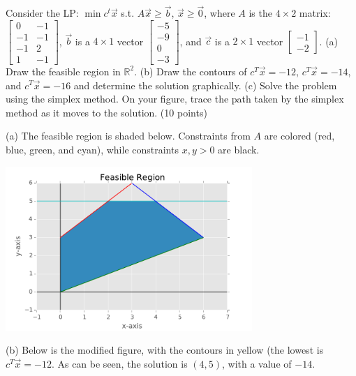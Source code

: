 \documentclass[fleqn]{homework}
\begin{document}
  \begin{problem}{5}
    \begin{question}
      Consider the LP: $\min c^t \vec{x}$ s.t. $A\vec{x} \geq \vec{b}$,
      $\vec{x} \geq \vec{0}$, where $A$ is the $4 \times 2$ matrix:
      $\begin{bmatrix*} 0 & -1 \\ -1 & -1 \\ -1 & 2 \\ 1 & -1 \end{bmatrix*}$,
      $\vec{b}$ is a $4 \times 1$ vector
      $\begin{bmatrix*} -5 \\ -9 \\ 0 \\ -3 \end{bmatrix*}$, and $\vec{c}$ is a
      $2 \times 1$ vector $\begin{bmatrix*} -1 \\ -2 \end{bmatrix*}$.  (a) Draw
      the feasible region in $\mathbb{R}^2$.  (b) Draw the contours of
      $c^T \vec{x} = -12$, $c^T \vec{x} = -14$, and $c^T \vec{x} = -16$ and
      determine the solution graphically.  (c) Solve the problem using the
      simplex method.  On your figure, trace the path taken by the simplex
      method as it moves to the solution. (10 points)
    \end{question}
    
    (a) The feasible region is shaded below.  Constraints from $A$ are colored
    (red, blue, green, and cyan), while constraints $x,y > 0$ are black.

    \begin{center}
      \includegraphics[width=0.7\textwidth]{feasible2.pdf}
    \end{center}

    (b) Below is the modified figure, with the contours in yellow (the lowest is
    $c^T \vec{x} = -12$.  As can be seen, the solution is $(4, 5)$, with a value
    of $-14$.


\end{problem}
\end{document}
